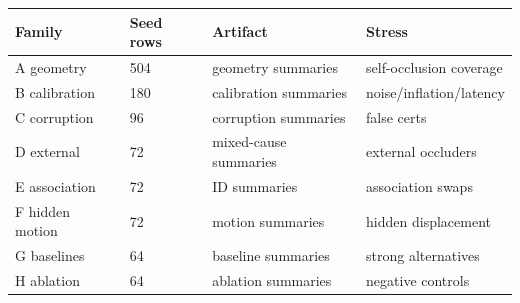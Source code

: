 \begin{tabular}{llll}
\toprule
Family & Seed rows & Artifact & Stress \\
\midrule
A geometry & 504 & geometry summaries & self-occlusion coverage \\
B calibration & 180 & calibration summaries & noise/inflation/latency \\
C corruption & 96 & corruption summaries & false certs \\
D external & 72 & mixed-cause summaries & external occluders \\
E association & 72 & ID summaries & association swaps \\
F hidden motion & 72 & motion summaries & hidden displacement \\
G baselines & 64 & baseline summaries & strong alternatives \\
H ablation & 64 & ablation summaries & negative controls \\
\bottomrule
\end{tabular}
